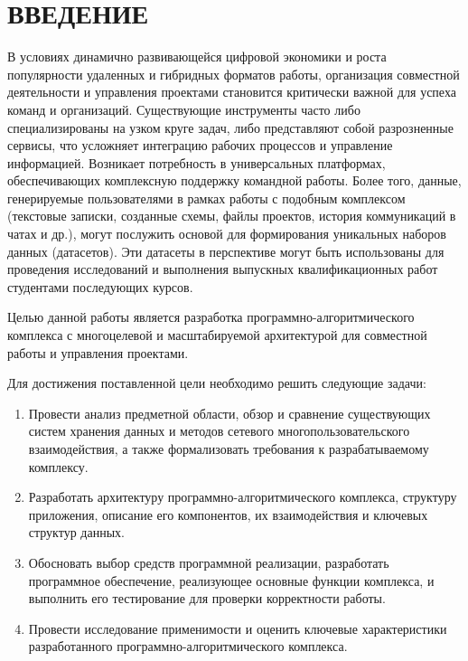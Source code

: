 \chapter*{ВВЕДЕНИЕ}

В условиях динамично развивающейся цифровой экономики и роста популярности удаленных и гибридных форматов работы, организация совместной деятельности и управления проектами становится критически важной для успеха команд и организаций. 
Существующие инструменты часто либо специализированы на узком круге задач, либо представляют собой разрозненные сервисы, что усложняет интеграцию рабочих процессов и управление информацией. 
Возникает потребность в универсальных платформах, обеспечивающих комплексную поддержку командной работы.
Более того, данные, генерируемые пользователями в рамках работы с подобным комплексом (текстовые записки, созданные схемы, файлы проектов, история коммуникаций в чатах и др.), могут послужить основой для формирования уникальных наборов данных (датасетов). 
Эти датасеты в перспективе могут быть использованы для проведения исследований и выполнения выпускных квалификационных работ студентами последующих курсов.

Целью данной работы является разработка программно-алгоритмического комплекса с многоцелевой и масштабируемой архитектурой для совместной работы и управления проектами.

Для достижения поставленной цели необходимо решить следующие задачи:

\begin{enumerate}
    \item Провести анализ предметной области, обзор и сравнение существующих систем хранения данных и методов сетевого многопользовательского взаимодействия, а также формализовать требования к разрабатываемому комплексу.
    \item Разработать архитектуру программно-алгоритмического комплекса, структуру приложения, описание его компонентов, их взаимодействия и ключевых структур данных.
    \item Обосновать выбор средств программной реализации, разработать программное обеспечение, реализующее основные функции комплекса, и выполнить его тестирование для проверки корректности работы.
    \item Провести исследование применимости и оценить ключевые характеристики разработанного программно-алгоритмического комплекса.
\end{enumerate}